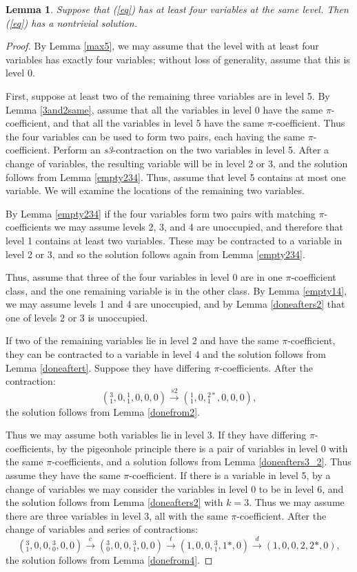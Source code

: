 \documentclass{article}
\newtheorem{lemma}{Lemma}
\begin{document}
\begin{lemma}\label{max4}
Suppose that (\ref{eq}) has at least four variables at the same level.  Then (\ref{eq}) has a nontrivial solution.
\end{lemma}
\begin{proof} By Lemma \ref{max5}, we may assume that the level with at least four variables has exactly four variables; without loss of generality, assume that this is level 0.

First, suppose at least two of the remaining three variables are in level 5.  By Lemma \ref{3and2same}, assume that all the variables in level 0 have the same $\pi$-coefficient, and that all the variables in level 5 have the same $\pi$-coefficient.  Thus the four variables can be used to form two pairs, each having the same $\pi$-coefficient.  Perform an \textit{s3}-contraction on the two variables in level 5.  After a change of variables, the resulting variable will be in level 2 or 3, and the solution follows from Lemma \ref{empty234}.  Thus, assume that level 5 contains at most one variable.  We will examine the locations of the remaining two variables.

By Lemma \ref{empty234} if the four variables form two pairs with matching $\pi$-coefficients we may assume levels 2, 3, and 4 are unoccupied, and therefore that level 1 contains at least two variables.  These may be contracted to a variable in level 2 or 3, and so the solution follows again from Lemma \ref{empty234}.

Thus, assume that three of the four variables in level 0 are in one $\pi$-coefficient class, and the one remaining variable is in the other class.  By Lemma \ref{empty14}, we may assume levels 1 and 4 are unoccupied, and by Lemma \ref{doneafters2} that one of levels 2 or 3 is unoccupied.

If two of the remaining variables lie in level 2 and have the same $\pi$-coefficient, they can be contracted to a variable in level 4 and the solution follows from Lemma \ref{doneaftert}.  Suppose they have differing $\pi$-coefficients.  After the contraction: 
$$(^{3}_{1},0,{}^{1}_{1},0,0,0) \xrightarrow{s2}
({}^{1}_{1},0,{}^{2*}_{1},0,0,0),$$
the solution follows from Lemma \ref{donefrom2}.

Thus we may assume both variables lie in level 3.  If they have differing $\pi$-coefficients, by the pigeonhole principle there is a pair of variables in level 0 with the same $\pi$-coefficients, and a solution follows from Lemma \ref{doneafters3_2}.  Thus assume they have the same $\pi$-coefficient.  If there is a variable in level 5, by a change of variables we may consider the variables in level 0 to be in level 6, and the solution follows from Lemma \ref{doneafters2} with $k=3$.  Thus we may assume there are three variables in level 3, all with the same $\pi$-coefficient.  After the change of variables and series of contractions:
$$({}^{3}_{1},0,0,{}^{3}_{0},0,0) \xrightarrow{c} ({}^{3}_{0},0,0,{}^{3}_{1},0,0) \xrightarrow{t} (1,0,0,{}^{3}_{1},1*,0) \xrightarrow{d} (1,0,0,2,2*,0),$$
the solution follows from Lemma \ref{donefrom4}.
\end{proof}
\end{document}

